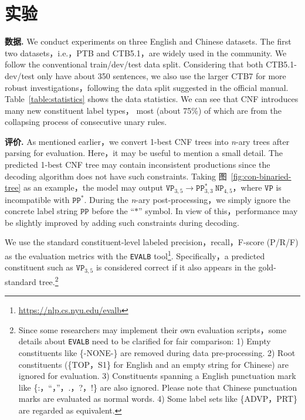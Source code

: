 \section{实验}
\label{sec:con-experiments}
\noindent\textbf{数据.}
We conduct experiments on three English and Chinese datasets.
The first two datasets，i.e.，PTB and CTB5.1，are widely used in the community.
We follow the conventional train/dev/test data split.
Considering that both CTB5.1-dev/test only have about 350 sentences,
we also use the larger CTB7 for more robust investigations，following the data split suggested in the official manual.
Table~\ref{table:statistics} shows the data statistics.
We can see that CNF introduces many new constituent label types， most (about 75\%) of which are from the collapsing process of consecutive unary rules.

\noindent\textbf{评价.}
As mentioned earlier，we convert 1-best CNF trees into \textit{n}-ary trees after parsing for evaluation.
Here，it may be useful to mention a small detail.
The predicted 1-best CNF tree may contain inconsistent productions since the decoding algorithm does not have such constraints.
Taking 图~\ref{fig:con-binaried-tree} as an example，the model may output $\texttt{VP}_{3,5} \rightarrow \texttt{PP}^{\ast}_{3,3} ~ \texttt{NP}_{4,5}$，where $\texttt{VP}$ is incompatible with $\texttt{PP}^{\ast}$.
During the \textit{n}-ary post-processing，we simply ignore the concrete label string $\texttt{PP}$ before the ``$\mathtt{\ast}$'' symbol.
In view of this，performance may be slightly improved by adding such constraints during decoding.

We use the standard constituent-level labeled precision，recall，F-score (P/R/F) as the evaluation metrics with the \texttt{EVALB} tool\footnote{\url{https://nlp.cs.nyu.edu/evalb}}.
Specifically，a predicted constituent such as $\texttt{VP}_{3,5}$ is considered correct if it also appears in the gold-standard tree.\footnote{
    Since some researchers may implement their own evaluation scripts，some details about \texttt{EVALB} need to be clarified for fair comparison:
    1) Empty constituents like \{-NONE-\} are removed during data pre-processing.
    2) Root constituents (\{TOP，S1\} for English and an empty string for Chinese) are ignored for evaluation.
    3) Constituents spanning a English punctuation mark like \{:，``，''，.，?，!\} are also ignored. Please note that Chinese punctuation marks are evaluated as normal words.
    4) Some label sets like \{ADVP，PRT\} are regarded as equivalent.}

